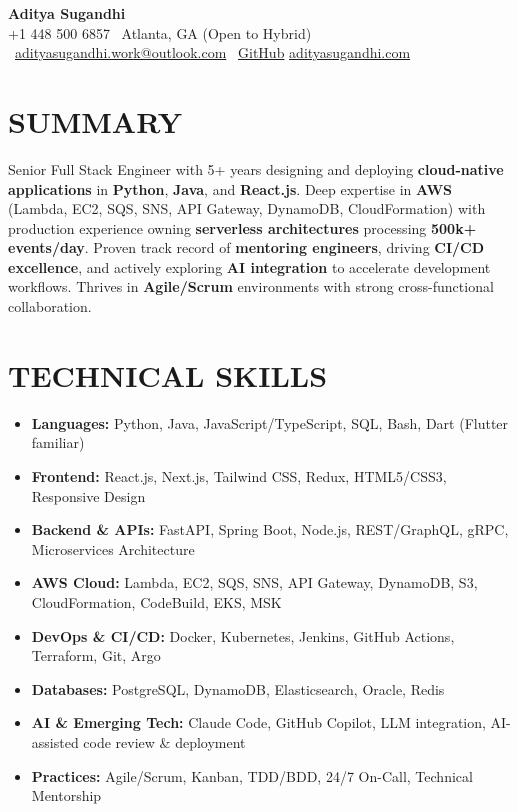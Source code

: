 \documentclass[letterpaper,10pt]{article}
\newcommand{\resumeItem}[1]{\item\small #1}
\begin{document}
\begin{center}
{\huge\textbf{Aditya Sugandhi}} \\
+1 448 500 6857 \textbar\ \textcolor{metablue}{Atlanta, GA (Open to Hybrid)} \textbar\
\href{mailto:adityasugandhi.work@outlook.com}{adityasugandhi.work@outlook.com} \textbar\
\href{https://github.com/adityasugandhi}{GitHub}
\textbar \href{https://adityasugandhi.com}{adityasugandhi.com}
\end{center}
\vspace{-12pt}

\section{\textcolor{metablue}{SUMMARY}}
\small
\vspace{-6pt}
Senior Full Stack Engineer with 5+ years designing and deploying \textbf{cloud-native applications} in \textbf{Python}, \textbf{Java}, and \textbf{React.js}. Deep expertise in \textbf{AWS} (Lambda, EC2, SQS, SNS, API Gateway, DynamoDB, CloudFormation) with production experience owning \textbf{serverless architectures} processing \textbf{500k+ events/day}. Proven track record of \textbf{mentoring engineers}, driving \textbf{CI/CD excellence}, and actively exploring \textbf{AI integration} to accelerate development workflows. Thrives in \textbf{Agile/Scrum} environments with strong cross-functional collaboration.

\vspace{-9pt}

\section{\textcolor{metablue}{TECHNICAL SKILLS}}
\vspace{-5pt}
\small
\begin{itemize}
\resumeItem{\textbf{Languages:} Python, Java, JavaScript/TypeScript, SQL, Bash, Dart (Flutter familiar)}
\resumeItem{\textbf{Frontend:} React.js, Next.js, Tailwind CSS, Redux, HTML5/CSS3, Responsive Design}
\resumeItem{\textbf{Backend \& APIs:} FastAPI, Spring Boot, Node.js, REST/GraphQL, gRPC, Microservices Architecture}
\resumeItem{\textbf{AWS Cloud:} Lambda, EC2, SQS, SNS, API Gateway, DynamoDB, S3, CloudFormation, CodeBuild, EKS, MSK}
\resumeItem{\textbf{DevOps \& CI/CD:} Docker, Kubernetes, Jenkins, GitHub Actions, Terraform, Git, Argo}
\resumeItem{\textbf{Databases:} PostgreSQL, DynamoDB, Elasticsearch, Oracle, Redis}
\resumeItem{\textbf{AI \& Emerging Tech:} Claude Code, GitHub Copilot, LLM integration, AI-assisted code review \& deployment}
\resumeItem{\textbf{Practices:} Agile/Scrum, Kanban, TDD/BDD, 24/7 On-Call, Technical Mentorship}
\end{itemize}
\vspace{-10pt}
\end{document}
